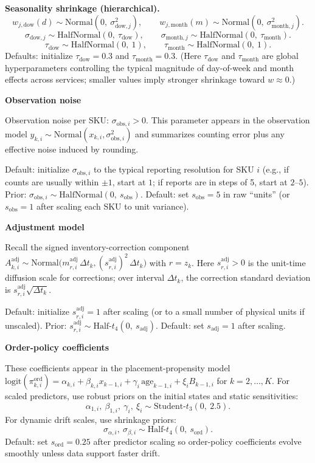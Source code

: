 \documentclass[11pt]{article}
\begin{document}
\textbf{Seasonality shrinkage (hierarchical).}
\[
  w_{j,\text{dow}}(d) \sim \text{Normal}(0,\ \sigma^2_{\text{dow},j}),\qquad
  w_{j,\text{month}}(m) \sim \text{Normal}(0,\ \sigma^2_{\text{month},j}).
\]
\[
  \sigma_{\text{dow},j} \sim \text{HalfNormal}(0,\ \tau_{\text{dow}}),\qquad
  \sigma_{\text{month},j} \sim \text{HalfNormal}(0,\ \tau_{\text{month}}).
\]
\[
  \tau_{\text{dow}} \sim \text{HalfNormal}(0,\ 1),\qquad
  \tau_{\text{month}} \sim \text{HalfNormal}(0,\ 1).
\]
Defaults: initialize $\tau_{\text{dow}}=0.3$ and $\tau_{\text{month}}=0.3$.
(Here $\tau_{\text{dow}}$ and $\tau_{\text{month}}$ are global hyperparameters controlling the typical magnitude of day-of-week and month effects across services; smaller values imply stronger shrinkage toward $w\approx 0$.)

\textbf{Observation noise}

Observation noise per SKU: $\sigma_{\text{obs},i} > 0$.
This parameter appears in the observation model
$y_{k,i}\sim\text{Normal}(x_{k,i},\sigma^2_{\text{obs},i})$ and summarizes counting error plus any effective noise induced by rounding.

Default: initialize $\sigma_{\text{obs},i}$ to the typical reporting resolution for SKU $i$ (e.g., if counts are usually within $\pm 1$, start at $1$; if reports are in steps of 5, start at $2$--$5$).
Prior: $\sigma_{\text{obs},i} \sim \text{HalfNormal}(0,\ s_{\text{obs}})$.
Default: set $s_{\text{obs}}=5$ in raw ``units'' (or $s_{\text{obs}}=1$ after scaling each SKU to unit variance).

\textbf{Adjustment model}

Recall the signed inventory-correction component
$A^{\mathrm{adj}}_{k,i} \sim \text{Normal}\bigl(m^{\mathrm{adj}}_{r,i}\,\Delta t_k,(s^{\mathrm{adj}}_{r,i})^2\,\Delta t_k\bigr)$ with $r=z_k$.
Here $s^{\mathrm{adj}}_{r,i}>0$ is the unit-time diffusion scale for corrections; over interval $\Delta t_k$, the correction standard deviation is $s^{\mathrm{adj}}_{r,i}\sqrt{\Delta t_k}$.

Default: initialize $s^{\mathrm{adj}}_{r,i}=1$ after scaling (or to a small number of physical units if unscaled).
Prior: $s^{\mathrm{adj}}_{r,i} \sim \text{Half-}t_{4}(0,\ s_{\text{adj}})$.
Default: set $s_{\text{adj}}=1$ after scaling.

\textbf{Order-policy coefficients}

These coefficients appear in the placement-propensity model
$\text{logit}(\pi^{\mathrm{ord}}_{k,i}) = \alpha_{k,i} + \beta_{k,i}x_{k-1,i} + \gamma_i\,\text{age}_{k-1,i} + \xi_i B_{k-1,i}$ for $k=2,\dots,K$.
For scaled predictors, use robust priors on the initial states and static sensitivities:
\[
  \alpha_{1,i},\ \beta_{1,i},\ \gamma_i,\ \xi_i \sim \text{Student-}t_{3}(0,\ 2.5).
\]
For dynamic drift scales, use shrinkage priors:
\[
  \sigma_{\alpha,i},\ \sigma_{\beta,i} \sim \text{Half-}t_4(0,\ s_{\text{ord}}).
\]
Default: set $s_{\text{ord}}=0.25$ after predictor scaling so order-policy coefficients evolve smoothly unless data support faster drift.
\end{document}
